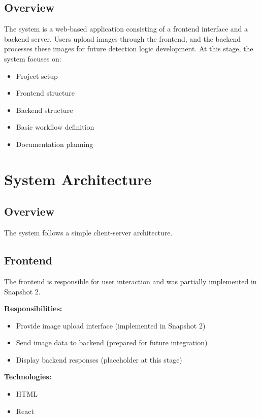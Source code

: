 \documentclass[12pt]{article}
\begin{document}
\subsection{Overview}

The system is a web-based application consisting of a frontend interface and a backend server. Users upload images through the frontend, and the backend processes these images for future detection logic development. At this stage, the system focuses on:
\begin{itemize}[noitemsep]
    \item Project setup
    \item Frontend structure
    \item Backend structure
    \item Basic workflow definition
    \item Documentation planning
\end{itemize}

\section{System Architecture}

\subsection{Overview}

The system follows a simple client-server architecture.

\subsection{Frontend}

The frontend is responsible for user interaction and was partially implemented in Snapshot 2.

\textbf{Responsibilities:}
\begin{itemize}[noitemsep]
    \item Provide image upload interface (implemented in Snapshot 2)
    \item Send image data to backend (prepared for future integration)
    \item Display backend responses (placeholder at this stage)
\end{itemize}

\textbf{Technologies:}
\begin{itemize}[noitemsep]
    \item HTML
    \item React
\end{itemize}
\end{document}
